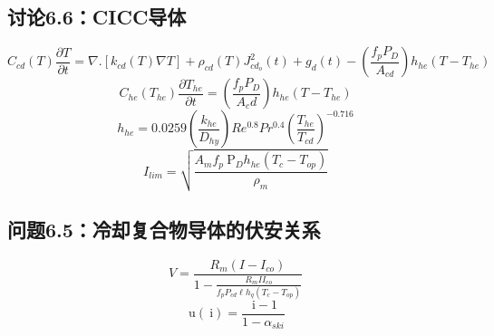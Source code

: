 \subsection{讨论6.6：CICC导体}
\begin{equation}%
C_{cd}(T)\frac{\partial T}{\partial t}=\nabla.[k_{cd}(T)\nabla T]+\rho_{cd}(T)J_{cd_o}^2(t)+g_d(t)-(\frac{f_pP_D}{A_{cd}})h_{he}(T-T_{he})
\end{equation}
\begin{equation}%
C_{he}(T_{he})\frac{\partial T_{he}}{\partial t}=(\frac{f_{p}P_D}{A_cd})h_{he}(T-T_{he})
\end{equation}
\begin{equation}%
h_{he}=0.0259(\frac{k_{he}}{D_{hy}})Re^{0.8}Pr^{0.4}(\frac{T_{he}}{T_{cd}})^{-0.716}
\end{equation}
\begin{equation}%
I_{lim}=\sqrt{\frac{A_mf_p\ \mathrm{P}_Dh_{he}(T_c-T_{op})}{\rho_m}}
\end{equation}




\subsection{问题6.5：冷却复合物导体的伏安关系}


\begin{equation}%
V=\frac{R_m(I-I_{co})}{1-\frac{R_mII_{co}}{f_pP_{cd}\ell h_q(T_c-T_{op})}}
\end{equation}
\begin{equation}%
\ \mathrm{u}(\ \mathrm{i})=\frac{\ \mathrm{i}-1}{1-\alpha_{ski}}
\end{equation}



